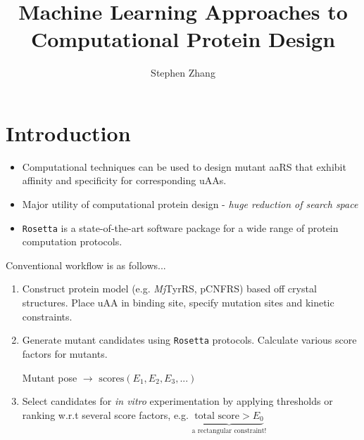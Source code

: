\documentclass{beamer}
\title{Machine Learning Approaches to Computational Protein Design}
\author{Stephen Zhang}
\begin{document}
\begin{frame}
  \titlepage
\end{frame}

\section{Introduction}

\begin{frame}
    \begin{itemize}
        \item Computational techniques can be used to design mutant aaRS that exhibit affinity and specificity for corresponding uAAs.
        \item Major utility of computational protein design - \textit{huge reduction of search space}
        \item \texttt{Rosetta} is a state-of-the-art software package for a wide range of protein computation protocols.
    \end{itemize}
\end{frame}

\begin{frame}
    Conventional workflow is as follows...
    \begin{enumerate}
        \item Construct protein model (e.g. \textit{Mj}TyrRS, pCNFRS) based off crystal structures. Place uAA in binding site, specify mutation sites and kinetic constraints.
        \item Generate mutant candidates using \texttt{Rosetta} protocols. Calculate various score factors for mutants.
        \begin{center}Mutant pose $\to$ $\mathrm{scores}(E_1, E_2, E_3, ...)$\end{center}
        \item Select candidates for \textit{in vitro} experimentation by applying thresholds or ranking w.r.t several score factors, e.g. $\underbrace{\text{total score} > E_0}_{\text{a rectangular constraint!}}$
    \end{enumerate}
\end{frame}
\end{document}
